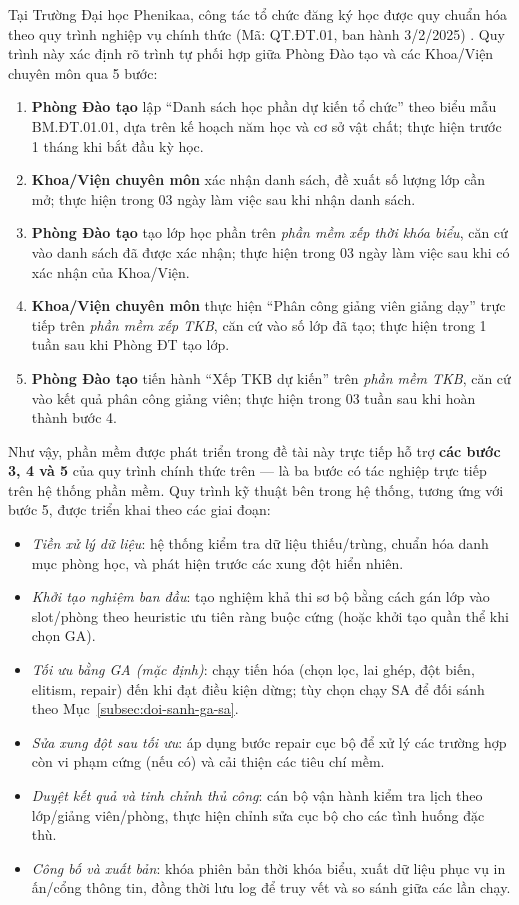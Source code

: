\documentclass[a4paper,12pt,oneside]{article}
\begin{document}
	Tại Trường Đại học Phenikaa, công tác tổ chức đăng ký học được quy chuẩn hóa theo quy trình nghiệp vụ chính thức (Mã: QT.ĐT.01, ban hành 3/2/2025) \cite{phenikaa2023quyche}. Quy trình này xác định rõ trình tự phối hợp giữa Phòng Đào tạo và các Khoa/Viện chuyên môn qua 5 bước:
	\begin{enumerate}
		\item \textbf{Phòng Đào tạo} lập ``Danh sách học phần dự kiến tổ chức'' theo biểu mẫu BM.ĐT.01.01, dựa trên kế hoạch năm học và cơ sở vật chất; thực hiện trước 1 tháng khi bắt đầu kỳ học.
		\item \textbf{Khoa/Viện chuyên môn} xác nhận danh sách, đề xuất số lượng lớp cần mở; thực hiện trong 03 ngày làm việc sau khi nhận danh sách.
		\item \textbf{Phòng Đào tạo} tạo lớp học phần trên \textit{phần mềm xếp thời khóa biểu}, căn cứ vào danh sách đã được xác nhận; thực hiện trong 03 ngày làm việc sau khi có xác nhận của Khoa/Viện.
		\item \textbf{Khoa/Viện chuyên môn} thực hiện ``Phân công giảng viên giảng dạy'' trực tiếp trên \textit{phần mềm xếp TKB}, căn cứ vào số lớp đã tạo; thực hiện trong 1 tuần sau khi Phòng ĐT tạo lớp.
		\item \textbf{Phòng Đào tạo} tiến hành ``Xếp TKB dự kiến'' trên \textit{phần mềm TKB}, căn cứ vào kết quả phân công giảng viên; thực hiện trong 03 tuần sau khi hoàn thành bước 4.
	\end{enumerate}

	Như vậy, phần mềm được phát triển trong đề tài này trực tiếp hỗ trợ \textbf{các bước 3, 4 và 5} của quy trình chính thức trên --- là ba bước có tác nghiệp trực tiếp trên hệ thống phần mềm. Quy trình kỹ thuật bên trong hệ thống, tương ứng với bước 5, được triển khai theo các giai đoạn:
	\begin{itemize}
		\item \textit{Tiền xử lý dữ liệu}: hệ thống kiểm tra dữ liệu thiếu/trùng, chuẩn hóa danh mục phòng học, và phát hiện trước các xung đột hiển nhiên.
		\item \textit{Khởi tạo nghiệm ban đầu}: tạo nghiệm khả thi sơ bộ bằng cách gán lớp vào slot/phòng theo heuristic ưu tiên ràng buộc cứng (hoặc khởi tạo quần thể khi chọn GA).
		\item \textit{Tối ưu bằng GA (mặc định)}: chạy tiến hóa (chọn lọc, lai ghép, đột biến, elitism, repair) đến khi đạt điều kiện dừng; tùy chọn chạy SA để đối sánh theo Mục~\ref{subsec:doi-sanh-ga-sa}.
		\item \textit{Sửa xung đột sau tối ưu}: áp dụng bước repair cục bộ để xử lý các trường hợp còn vi phạm cứng (nếu có) và cải thiện các tiêu chí mềm.
		\item \textit{Duyệt kết quả và tinh chỉnh thủ công}: cán bộ vận hành kiểm tra lịch theo lớp/giảng viên/phòng, thực hiện chỉnh sửa cục bộ cho các tình huống đặc thù.
		\item \textit{Công bố và xuất bản}: khóa phiên bản thời khóa biểu, xuất dữ liệu phục vụ in ấn/cổng thông tin, đồng thời lưu log để truy vết và so sánh giữa các lần chạy.
	\end{itemize}
\end{document}
